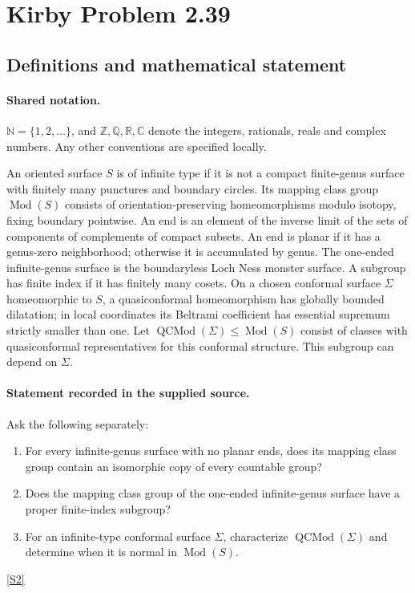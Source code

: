 \documentclass[11pt]{article}
\newcommand{\sref}[2]{\hyperlink{source:#1:#2}{[S#2]}}
\begin{document}
\section{Kirby Problem 2.39}\label{statement}

\subsection{Definitions and mathematical statement}

\paragraph{Shared notation.}$\mathbb N=\{1,2,\ldots\}$, and $\mathbb Z,\mathbb Q,\mathbb R,\mathbb C$ denote the integers, rationals, reals and complex numbers. Any other conventions are specified locally.


An oriented surface $S$ is of infinite type if it is not a compact finite-genus surface with finitely many punctures and boundary circles. Its mapping class group $\operatorname{Mod}(S)$ consists of orientation-preserving homeomorphisms modulo isotopy, fixing boundary pointwise. An end is an element of the inverse limit of the sets of components of complements of compact subsets. An end is planar if it has a genus-zero neighborhood; otherwise it is accumulated by genus. The one-ended infinite-genus surface is the boundaryless Loch Ness monster surface. A subgroup has finite index if it has finitely many cosets. On a chosen conformal surface $\Sigma$ homeomorphic to $S$, a quasiconformal homeomorphism has globally bounded dilatation; in local coordinates its Beltrami coefficient has essential supremum strictly smaller than one. Let $\operatorname{QCMod}(\Sigma)\le\operatorname{Mod}(S)$ consist of classes with quasiconformal representatives for this conformal structure. This subgroup can depend on $\Sigma$.
\paragraph{Statement recorded in the supplied source.}
Ask the following separately:
\begin{enumerate}
\item For every infinite-genus surface with no planar ends, does its mapping class group contain an isomorphic copy of every countable group?
\item Does the mapping class group of the one-ended infinite-genus surface have a proper finite-index subgroup?
\item For an infinite-type conformal surface $\Sigma$, characterize $\operatorname{QCMod}(\Sigma)$ and determine when it is normal in $\operatorname{Mod}(S)$.
\end{enumerate} \sref{statement}{2}
\end{document}
